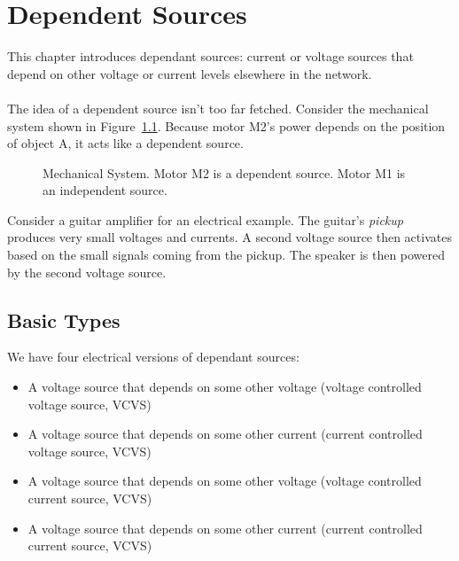 \chapter{Dependent Sources}
This chapter introduces dependant sources: current or voltage sources that depend on other voltage or current levels elsewhere in the network.\\
\\
The idea of a dependent source isn't too far fetched. Consider the mechanical system shown in Figure~\ref{F:5MDS}. Because motor M2's power depends on the position of object A, it acts like a dependent source.

\begin{figure}[H]
\begin{center}
\caption{Mechanical System. Motor M2 is a dependent source. Motor M1 is an independent source.}
\label{F:5MDS}
\end{center}
\end{figure}

\noindent
Consider a guitar amplifier for an electrical example. The guitar's \emph{pickup} produces very small voltages and currents. A second voltage source then activates based on the small signals coming from the pickup. The speaker is then powered by the second voltage source.\\

\section{Basic Types}
We have four electrical versions of dependant sources:
\begin{itemize}
\item A voltage source that depends on some other voltage (voltage controlled voltage source, VCVS)
\item A voltage source that depends on some other current (current controlled voltage source, VCVS)
\item A voltage source that depends on some other voltage (voltage controlled current source, VCVS)
\item A voltage source that depends on some other current (current controlled current source, VCVS)
\end{itemize}

